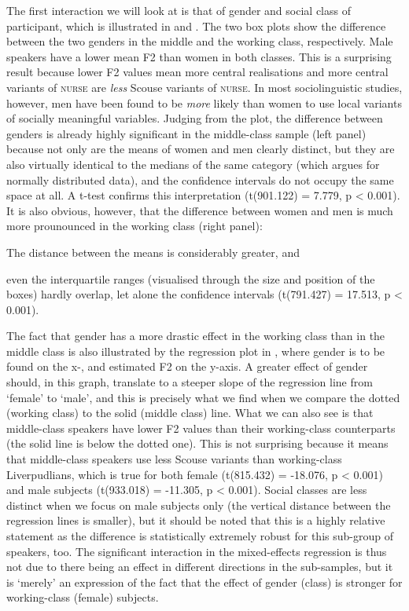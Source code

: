 The first interaction we will look at is that of gender and social class of participant, which is illustrated in  and .
The two box plots show the difference between the two genders in the middle and the working class, respectively.
Male speakers have a lower mean F2 than women in both classes.
This is a surprising result because lower F2 values mean more central realisations and more central variants of \textsc{nurse} are \emph{less} Scouse variants of \textsc{nurse}.
In most sociolinguistic studies, however, men have been found to be \emph{more} likely than women to use local variants of socially meaningful variables.
Judging from the plot, the difference between genders is already highly significant in the middle-class sample (left panel) because not only are the means of women and men clearly distinct, but they are also virtually identical to the medians of the same category (which argues for normally distributed data), and the confidence intervals do not occupy the same space at all.
A t-test confirms this interpretation (t(901.122) = 7.779, p < 0.001).
It is also obvious, however, that the difference between women and men is much more prounounced in the working class (right panel):
\begin{inparaenum}[(a)]
	\item The distance between the means is considerably greater, and
	\item even the interquartile ranges (visualised through the size and position of the boxes) hardly overlap, let alone the confidence intervals (t(791.427) = 17.513, p < 0.001).
\end{inparaenum}

The fact that gender has a more drastic effect in the working class than in the middle class is also illustrated by the regression plot in , where gender is to be found on the x-, and estimated F2 on the y-axis.
A greater effect of gender should, in this graph, translate to a steeper slope of the regression line from `female' to `male', and this is precisely what we find when we compare the dotted (working class) to the solid (middle class) line.
What we can also see is that middle-class speakers have lower F2 values than their working-class counterparts (the solid line is below the dotted one).
This is not surprising because it means that middle-class speakers use less Scouse variants than working-class Liverpudlians, which is true for both female (t(815.432) = -18.076, p < 0.001) and male subjects (t(933.018) = -11.305, p < 0.001).
Social classes are less distinct when we focus on male subjects only (the vertical distance between the regression lines is smaller), but it should be noted that this is a highly relative statement as the difference is statistically extremely robust for this sub-group of speakers, too.
The significant interaction in the mixed-effects regression is thus not due to there being an effect in different directions in the sub-samples, but it is `merely' an expression of the fact that the effect of gender (class) is stronger for working-class (female) subjects.

